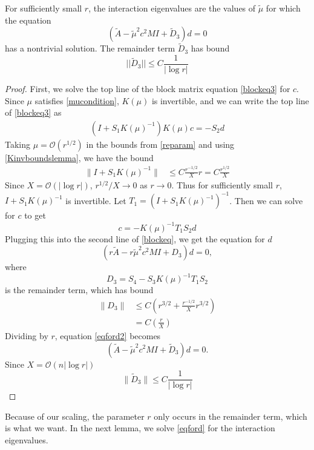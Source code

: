 \documentclass[thesis.tex]{subfiles}
\begin{document}
\begin{lemma}\label{deqlemma}
For sufficiently small $r$, the interaction eigenvalues are the values of $\tilde{\mu}$ for which the equation
\begin{equation}\label{eqford}
(\tilde{A} - \tilde{\mu}^2 c^2 MI + \tilde{D}_3)d = 0
\end{equation}
has a nontrivial solution. The remainder term $\tilde{D}_3$ has bound
\begin{equation}\label{tildeD3bound}
||\tilde{D}_3|| \leq C \frac{1}{|\log r|} 
\end{equation}
\begin{proof}
First, we solve the top line of the block matrix equation \eqref{blockeq3} for $c$. Since $\mu$ satisfies \cref{mucondition}, $K(\mu)$ is invertible, and we can write the top line of \eqref{blockeq3} as
\begin{align*}
(I + S_1 K(\mu)^{-1} ) K(\mu) c = -S_2 d
\end{align*}
Taking $\mu = \mathcal{O}(r^{1/2})$ in the bounds from \cref{reparam} and using \cref{Kinvboundslemma}, we have the bound
\begin{align*}
\|I + S_1 K(\mu)^{-1}\| &\leq C \frac{r^{-1/2}}{X} r = C \frac{r^{1/2}}{X}
\end{align*}
Since $X = \mathcal{O}(|\log r|)$, $r^{1/2}/X \rightarrow 0$ as $r \rightarrow 0$. Thus for sufficiently small $r$, $I + S_1 K(\mu)^{-1}$ is invertible. Let $T_1 = (I + S_1 K(\mu)^{-1})^{-1}$. Then we can solve for $c$ to get
\[
c = -K(\mu)^{-1} T_1 S_2 d
\]
Plugging this into the second line of \eqref{blockeq}, we get the equation for $d$
\begin{equation}\label{eqford2}
(r\tilde{A} - r \tilde{\mu}^2 c^2  M I + D_3)d = 0,
\end{equation}
where
\[
D_3 = S_4 - S_3 K(\mu)^{-1} T_1 S_2 
\]
is the remainder term, which has bound
\begin{align*}
\|D_3\| &\leq C \left( r^{3/2} + \frac{r^{-1/2}}{X} r^{3/2} \right) \\
&= C \left( \frac{r}{X} \right)
\end{align*}
Dividing by $r$, equation \cref{eqford2} becomes
\[
(\tilde{A} - \tilde{\mu}^2 c^2 MI + \tilde{D}_3)d = 0.
\]
Since $X = \mathcal{O}(n |\log r|)$
\[
\|\tilde{D}_3\| \leq C \frac{1}{|\log r|} 
\]
\end{proof}
\end{lemma}

Because of our scaling, the parameter $r$ only occurs in the remainder term, which is what we want. In the next lemma, we solve \eqref{eqford} for the interaction eigenvalues.
\end{document}
